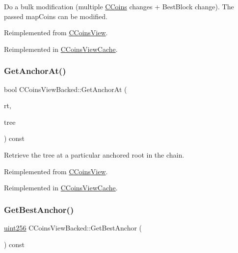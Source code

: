 Do a bulk modification (multiple \mbox{\hyperlink{class_c_coins}{C\+Coins}} changes + Best\+Block change). The passed map\+Coins can be modified. 

Reimplemented from \mbox{\hyperlink{class_c_coins_view_a6e0ef2f996f5bf9f15c4fcae89333c7d}{C\+Coins\+View}}.



Reimplemented in \mbox{\hyperlink{class_c_coins_view_cache_a3d661381b7eb233a8a13ea11ec5dac51}{C\+Coins\+View\+Cache}}.

\mbox{\label{class_c_coins_view_backed_a85e573aed0a7e713dc5d6a0478649435}} 
\subsubsection{\texorpdfstring{Get\+Anchor\+At()}{GetAnchorAt()}}
{\footnotesize\ttfamily bool C\+Coins\+View\+Backed\+::\+Get\+Anchor\+At (\begin{DoxyParamCaption}\item[{const \mbox{\hyperlink{classuint256}{uint256}} \&}]{rt,  }\item[{Z\+C\+Incremental\+Merkle\+Tree \&}]{tree }\end{DoxyParamCaption}) const\hspace{0.3cm}{\ttfamily [virtual]}}



Retrieve the tree at a particular anchored root in the chain. 



Reimplemented from \mbox{\hyperlink{class_c_coins_view_a2fcf3f99111eef1c41243f54f94d3be8}{C\+Coins\+View}}.



Reimplemented in \mbox{\hyperlink{class_c_coins_view_cache_a97401da3be42b24b16fc202cdce34419}{C\+Coins\+View\+Cache}}.

\mbox{\label{class_c_coins_view_backed_a2bac0f246916a004e9773f03c37f2c82}} 
\subsubsection{\texorpdfstring{Get\+Best\+Anchor()}{GetBestAnchor()}}
{\footnotesize\ttfamily \mbox{\hyperlink{classuint256}{uint256}} C\+Coins\+View\+Backed\+::\+Get\+Best\+Anchor (\begin{DoxyParamCaption}{ }\end{DoxyParamCaption}) const\hspace{0.3cm}{\ttfamily [virtual]}}



